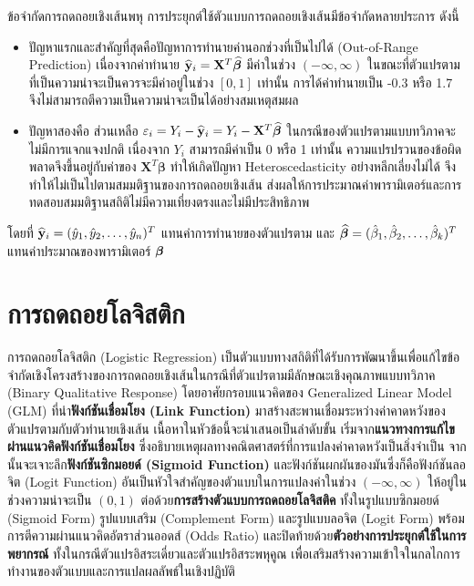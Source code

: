 \begin{myLimit}[]{ข้อจำกัดการถดถอยเชิงเส้นพหุ}{} การประยุกต์ใช้ตัวแบบการถดถอยเชิงเส้นมีข้อจำกัดหลายประการ ดังนี้
	
	\begin{itemize}
		\item ปัญหาแรกและสำคัญที่สุดคือปัญหาการทำนายค่านอกช่วงที่เป็นไปได้ (Out-of-Range Prediction) เนื่องจากค่าทำนาย $\widehat{\mathbf{y}}_i = \mathbf{X}^{T} \widehat{\boldsymbol{\beta}}$ มีค่าในช่วง $(-\infty, \infty)$ ในขณะที่ตัวแปรตามที่เป็นความน่าจะเป็นควรจะมีค่าอยู่ในช่วง $[0, 1]$ เท่านั้น การได้ค่าทำนายเป็น -0.3 หรือ 1.7 จึงไม่สามารถตีความเป็นความน่าจะเป็นได้อย่างสมเหตุสมผล
		
		\item ปัญหาสองคือ ส่วนเหลือ  $\varepsilon_i = Y_i - \widehat{\mathbf{y}}_i = Y_i -  \mathbf{X}^{T} \widehat{\boldsymbol{\beta}}$ ในกรณีของตัวแปรตามแบบทวิภาคจะไม่มีการแจกแจงปกติ เนื่องจาก $Y_i$ สามารถมีค่าเป็น 0 หรือ 1 เท่านั้น ความแปรปรวนของข้อผิดพลาดจึงขึ้นอยู่กับค่าของ $\mathbf{X}^{T} \boldsymbol{\beta}$ ทำให้เกิดปัญหา Heteroscedasticity อย่างหลีกเลี่ยงไม่ได้ จึงทำให้ไม่เป็นไปตามสมมติฐานของการถดถอยเชิงเส้น ส่งผลให้การประมาณค่าพารามิเตอร์และการทดสอบสมมติฐานสถิติไม่มีความเที่ยงตรงและไม่มีประสิทธิภาพ
	\end{itemize}
	โดยที่ $\widehat{\mathbf{y}}_i=(\hat{y}_{1}, \hat{y}_{2}, \ldots, \hat{y}_{n})^T$ แทนค่าการทำนายของตัวแปรตาม และ $\widehat{\boldsymbol{\beta}}=(\hat{\beta}_{1}, \hat{\beta}_{2}, \ldots, \hat{\beta}_{k})^T$
	แทนค่าประมาณของพารามิเตอร์ $\boldsymbol{\beta}$
\end{myLimit} 


\section{การถดถอยโลจิสติก}
การถดถอยโลจิสติก (Logistic Regression) เป็นตัวแบบทางสถิติที่ได้รับการพัฒนาขึ้นเพื่อแก้ไขข้อจำกัดเชิงโครงสร้างของการถดถอยเชิงเส้นในกรณีที่ตัวแปรตามมีลักษณะเชิงคุณภาพแบบทวิภาค (Binary Qualitative Response) โดยอาศัยกรอบแนวคิดของ Generalized Linear Model (GLM) ที่นำ\textbf{ฟังก์ชันเชื่อมโยง (Link Function)} มาสร้างสะพานเชื่อมระหว่างค่าคาดหวังของตัวแปรตามกับตัวทำนายเชิงเส้น เนื้อหาในหัวข้อนี้จะนำเสนอเป็นลำดับขั้น เริ่มจาก\textbf{แนวทางการแก้ไขผ่านแนวคิดฟังก์ชันเชื่อมโยง} ซึ่งอธิบายเหตุผลทางคณิตศาสตร์ที่การแปลงค่าคาดหวังเป็นสิ่งจำเป็น จากนั้นจะเจาะลึก\textbf{ฟังก์ชันซิกมอยด์ (Sigmoid Function)} และฟังก์ชันผกผันของมันซึ่งก็คือฟังก์ชันลอจิต (Logit Function) อันเป็นหัวใจสำคัญของตัวแบบในการแปลงค่าในช่วง $(-\infty, \infty)$ ให้อยู่ในช่วงความน่าจะเป็น $(0, 1)$ ต่อด้วย\textbf{การสร้างตัวแบบการถดถอยโลจิสติค} ทั้งในรูปแบบซิกมอยด์ (Sigmoid Form) รูปแบบเสริม (Complement Form) และรูปแบบลอจิต (Logit Form) พร้อมการตีความผ่านแนวคิดอัตราส่วนออดส์ (Odds Ratio) และปิดท้ายด้วย\textbf{ตัวอย่างการประยุกต์ใช้ในการพยากรณ์} ทั้งในกรณีตัวแปรอิสระเดี่ยวและตัวแปรอิสระพหุคูณ เพื่อเสริมสร้างความเข้าใจในกลไกการทำงานของตัวแบบและการแปลผลลัพธ์ในเชิงปฏิบัติ


